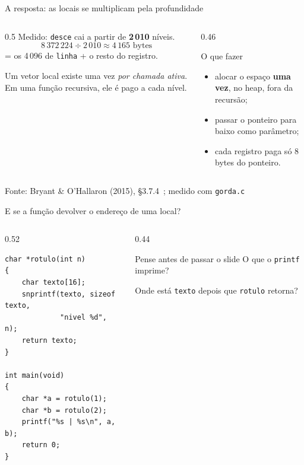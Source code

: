 \documentclass[aspectratio=169]{beamer}
\newcommand{\fonte}[1]{\vfill\hfill{\scriptsize\textcolor{UFSGray}{Fonte: #1}}}
\begin{document}
\begin{frame}{A resposta: as locais se multiplicam pela profundidade}
  \begin{columns}[c]
    \begin{column}{0.5\textwidth}
      \small
      Medido: \texttt{desce} cai a partir de \textbf{2\,010} níveis.
      \[
        8\,372\,224 \div 2\,010 \approx 4\,165 \text{ bytes}
      \]
      = os 4\,096 de \texttt{linha} + o resto do registro.

      \medskip
      Um vetor local existe uma vez \emph{por chamada ativa}. Em uma função
      recursiva, ele é pago a cada nível.
    \end{column}
    \begin{column}{0.46\textwidth}
      \begin{block}{O que fazer}
        \small
        \begin{itemize}
          \item alocar o espaço \textbf{uma vez}, no heap, fora da
            recursão;
          \item passar o ponteiro para baixo como parâmetro;
          \item cada registro paga só 8 bytes do ponteiro.
        \end{itemize}
      \end{block}
    \end{column}
  \end{columns}
  \fonte{Bryant \& O'Hallaron (2015), §3.7.4~\cite{bryant2015computer};
    medido com \texttt{gorda.c}}
\end{frame}

\begin{frame}[fragile]{E se a função devolver o endereço de uma local?}
  \begin{columns}[c]
    \begin{column}{0.52\textwidth}
\begin{lstlisting}[style=tinyC]
char *rotulo(int n)
{
    char texto[16];
    snprintf(texto, sizeof texto,
             "nivel %d", n);
    return texto;
}

int main(void)
{
    char *a = rotulo(1);
    char *b = rotulo(2);
    printf("%s | %s\n", a, b);
    return 0;
}
\end{lstlisting}
    \end{column}
    \begin{column}{0.44\textwidth}
      \begin{block}{Pense antes de passar o slide}
        \small O que o \texttt{printf} imprime?

        \medskip
        Onde está \texttt{texto} depois que \texttt{rotulo} retorna?
      \end{block}
    \end{column}
  \end{columns}
\end{frame}
\end{document}
